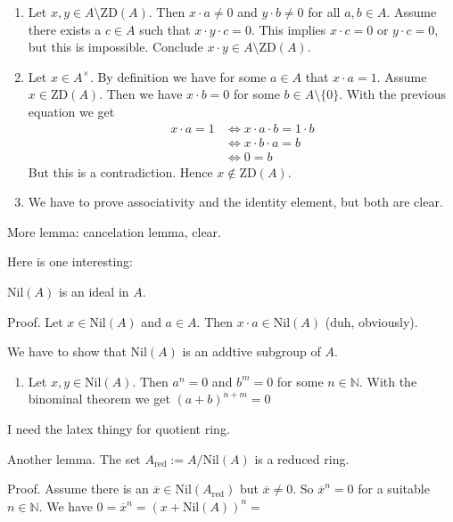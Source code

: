\documentclass{book}
\theoremstyle{custom_definition}
\theoremstyle{custom_theorem}
\begin{document}
    \begin{enumerate}
        \item Let \(x, y \in A \setminus \text{ZD}(A)\). Then \(x \cdot a \neq 0\) and \(y \cdot b \neq 0\) for all \(a, b \in A\). Assume there exists a \(c \in A\) such that \(x \cdot y \cdot c = 0\). This implies \(x \cdot c = 0\) or \(y \cdot c = 0\), but this is impossible. Conclude \(x \cdot y \in A \setminus \text{ZD}(A)\).
        \item Let \(x \in A^\times\). By definition we have for some \(a \in A\) that \(x \cdot a = 1\). Assume \(x \in \text{ZD}(A)\). Then we have \(x \cdot b = 0\) for some \(b \in A \setminus \{0\}\). With the previous equation we get
        \begin{align}
            x \cdot a = 1 & \iff x \cdot a \cdot b = 1 \cdot b \\
            & \iff x \cdot b \cdot a = b \\
            & \iff 0 = b
        \end{align}
        But this is a contradiction. Hence \(x \not\in \text{ZD}(A)\).
        \item We have to prove associativity and the identity element, but both are clear.
    \end{enumerate}

    More lemma: cancelation lemma, clear.

    Here is one interesting:

    \(\text{Nil}(A)\) is an ideal in \(A\).

    Proof. Let \(x \in \text{Nil}(A)\) and \(a \in A\). Then \(x \cdot a \in \text{Nil}(A)\) (duh, obviously).

    We have to show that \(\text{Nil}(A)\) is an addtive subgroup of \(A\).

    \begin{enumerate}
        \item Let \(x, y \in \text{Nil}(A)\). Then \(a^n = 0\) and \(b^m = 0\) for some \(n \in \mathbb{N}\). With the binominal theorem we get \((a + b)^{n + m}= 0\)
    \end{enumerate}

    I need the latex thingy for quotient ring.

    Another lemma. The set \(A_{\text{red}} := A / \text{Nil}(A)\) is a reduced ring.

    Proof. Assume there is an \(\overline{x} \in \text{Nil}(A_{\text{red}})\) but \(\overline{x} \neq 0\). So \(\overline{x}^n = 0\) for a suitable \(n \in \mathbb{N}\). We have \(0 = \overline{x}^n = (x + \text{Nil}(A))^n = \)
\end{document}
